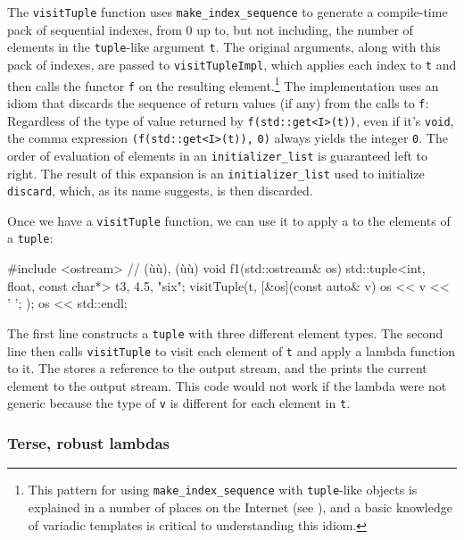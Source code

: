 {\noindent The \lstinline!visitTuple! function uses \lstinline!make_index_sequence! to
generate a compile-time pack of sequential indexes, from 0 up to, but
not including, the number of elements in the \lstinline!tuple!-like
argument \lstinline!t!. The original arguments, along with this pack of
indexes, are passed to \lstinline!visitTupleImpl!, which applies each index
to \lstinline!t! and then calls the functor \lstinline!f! on the resulting
element.{\cprotect\footnote{This pattern for using
\lstinline!make_index_sequence! with \lstinline!tuple!-like objects is
explained in a number of places on the Internet (see \cite{prowl13}),
and a basic knowledge of variadic templates
   is critical to understanding this
  idiom.}} The implementation uses an idiom that discards the sequence
of return values (if any) from the calls to \lstinline!f!: Regardless of
the type of value returned by \lstinline!f(std::get<I>(t))!, even if it's
\lstinline!void!, the comma expression \lstinline!(f(std::get<I>(t)),!
\lstinline!0)! always yields the integer \lstinline!0!. The order of
evaluation of elements in an \lstinline!initializer_list! is guaranteed
left to right. The result of this expansion is an
\lstinline!initializer_list! used to initialize \lstinline!discard!, which,
as its name suggests, is then discarded.

Once we have a \lstinline!visitTuple! function, we can use it to apply a
 to the elements of a \lstinline!tuple!:

\begin{emcppslisting}[emcppsbatch=e4]
#include <ostream>  // (ù{}ù), (ù{}ù)
void f1(std::ostream& os)
{
    std::tuple<int, float, const char*> t{3, 4.5, "six"};
    visitTuple(t, [&os](const auto& v){ os << v << ' '; });
    os << std::endl;
}
\end{emcppslisting}
    

\noindent The first line constructs a \lstinline!tuple! with three different element
types. The second line then calls \lstinline!visitTuple! to visit each
element of \lstinline!t! and apply a lambda function to it. The
 stores a reference to the output stream, and the
 prints the current element to the output stream.
This code would not work if the lambda were not generic because the type
of \lstinline!v! is different for each element in \lstinline!t!.

\subsubsection[Terse, robust lambdas]{Terse, robust lambdas}\label{terse,-robust-lambdas}

}
